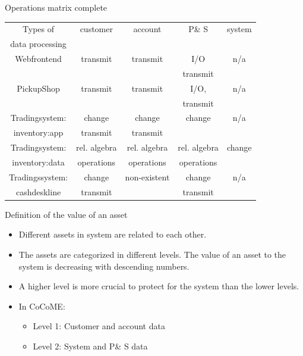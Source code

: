 \documentclass[18pt]{beamer}
\begin{document}
\begin{frame}{Operations matrix complete}
\begin{table}
\begin{tabular}{|c|c|c|c|c|}
\hline 
Types of  & customer & account & P\& S & system  \\ 
data processing  & & & & \\
\hline 
Webfrontend &  transmit & transmit & I/O & n/a \\ 
& & &  transmit & \\
\hline 
PickupShop &  transmit & transmit & I/O, & n/a \\ 
& & & transmit & \\
\hline 
Tradingsystem:& change & change & change & n/a \\ 
inventory:app & transmit& transmit & & \\
\hline 
Tradingsystem: & rel. algebra& rel. algebra& rel. algebra& change \\
inventory:data & operations & operations & operations & \\ 
\hline
Tradingssystem: & change & non-existent & change & n/a \\
cashdeskline & transmit &  & transmit & \\
\hline 
\end{tabular} 

\end{table}
\end{frame}

\begin{frame}{Definition of the value of an asset}
\begin{itemize}
\item Different assets in system are related to each other.
\item The assets are categorized in different levels. The value of an asset to the system is decreasing with descending numbers.
\item A higher level is more crucial to protect for the system than the lower levels.
\item In CoCoME:
\begin{itemize}
\item Level 1: Customer and account data 
\item Level 2: System and P\& S data
\end{itemize}
\end{itemize}
\end{frame}
\end{document}
